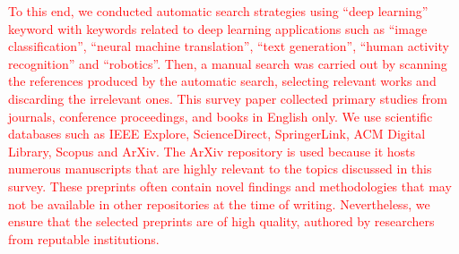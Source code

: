 \documentclass[preprint,12pt]{elsarticle}
\begin{document}
\textcolor{red}{To this end, we conducted automatic search strategies using ``deep learning'' keyword with keywords related to deep learning applications such as ``image classification'', ``neural machine translation'', ``text generation'', ``human activity recognition'' and ``robotics''. Then, a manual search was carried out by scanning the references produced by the automatic search, selecting relevant works and discarding the irrelevant ones. This survey paper collected primary studies from journals, conference proceedings, and books in English only. We use scientific databases such as IEEE Explore, ScienceDirect, SpringerLink, ACM Digital Library, Scopus and ArXiv. The ArXiv repository is used because it hosts numerous manuscripts that are highly relevant to the topics discussed in this survey. These preprints often contain novel findings and methodologies that may not be available in other repositories at the time of writing. Nevertheless, we ensure that the selected preprints are of high quality, authored by researchers from reputable institutions.}
\end{document}
